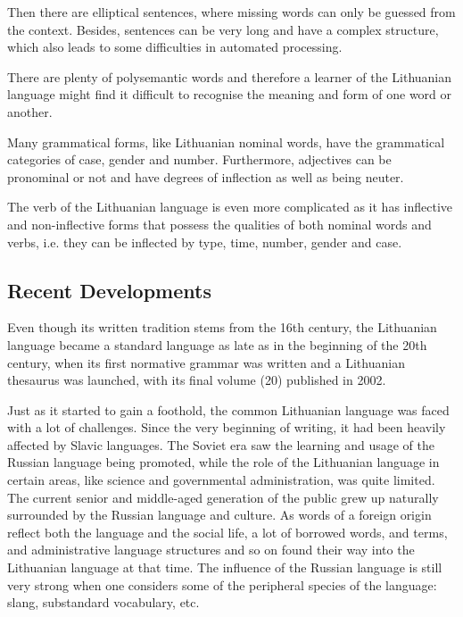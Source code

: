 \documentclass[]{../metanetpaper}
\begin{document}
\begin{multicols}{2}
Then there are elliptical sentences, where missing words can only be guessed from the context. Besides, sentences can be very long and have a complex structure, which also leads to some difficulties in automated processing.


There are plenty of polysemantic words and therefore a learner of the Lithuanian language might find it difficult to recognise the meaning and form of one word or another. 

Many grammatical forms, like Lithuanian nominal words, have the grammatical categories of case, gender and number. Furthermore, adjectives can be pronominal or not and have degrees of inflection as well as being neuter.

The verb of the Lithuanian language is even more complicated as it has inflective and non-inflective forms that possess the qualities of both nominal words and verbs, i.e. they can be inflected by type, time, number, gender and case.

\subsection{Recent Developments}

Even though its written tradition stems from the 16th century, the Lithuanian language became a standard language as late as in the beginning of the 20th century, when its first normative grammar was written and a Lithuanian thesaurus was launched, with its final volume (20) published in 2002.

   Just as it started to gain a foothold, the common Lithuanian language was faced with a lot of challenges. Since the very beginning of writing, it had been heavily affected by Slavic languages. The Soviet era saw the learning and usage of the Russian language being promoted, while the role of the Lithuanian language in certain areas, like science and governmental administration, was quite limited. The current senior and middle-aged generation of the public grew up naturally surrounded by the Russian language and culture. As words of a foreign origin reflect both the language and the social life, a lot of borrowed words, and terms, and administrative language structures and so on found their way into the Lithuanian language at that time. The influence of the Russian language is still very strong when one considers some of the peripheral species of the language: slang, substandard vocabulary, etc.


\end{multicols}
\end{document}
